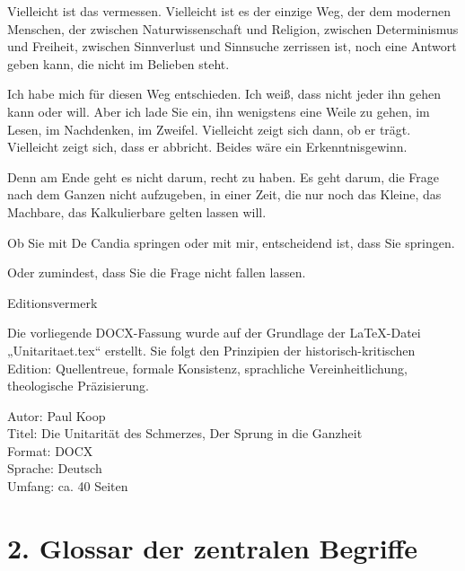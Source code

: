 \documentclass[
  ngerman,
]{article}
\begin{document}
Vielleicht ist das vermessen. Vielleicht ist es der einzige Weg, der dem
modernen Menschen, der zwischen Naturwissenschaft und Religion, zwischen
Determinismus und Freiheit, zwischen Sinnverlust und Sinnsuche zerrissen
ist, noch eine Antwort geben kann, die nicht im Belieben steht.

Ich habe mich für diesen Weg entschieden. Ich weiß, dass nicht jeder ihn
gehen kann oder will. Aber ich lade Sie ein, ihn wenigstens eine Weile
zu gehen, im Lesen, im Nachdenken, im Zweifel. Vielleicht zeigt sich
dann, ob er trägt. Vielleicht zeigt sich, dass er abbricht. Beides wäre
ein Erkenntnisgewinn.

Denn am Ende geht es nicht darum, recht zu haben. Es geht darum, die
Frage nach dem Ganzen nicht aufzugeben, in einer Zeit, die nur noch
das Kleine, das Machbare, das Kalkulierbare gelten lassen will.

Ob Sie mit De Candia springen oder mit mir, entscheidend ist, dass Sie
springen.

Oder zumindest, dass Sie die Frage nicht fallen lassen.

Editionsvermerk

Die vorliegende DOCX-Fassung wurde auf der Grundlage der LaTeX-Datei
„Unitaritaet.tex`` erstellt. Sie folgt den Prinzipien der
historisch-kritischen Edition: Quellentreue, formale Konsistenz,
sprachliche Vereinheitlichung, theologische Präzisierung.

Autor: Paul Koop\\
Titel: Die Unitarität des Schmerzes, Der Sprung in die Ganzheit\\
Format: DOCX\\
Sprache: Deutsch\\
Umfang: ca. 40 Seiten

\section{\texorpdfstring{\textbf{2. Glossar der zentralen
Begriffe}}{2. Glossar der zentralen Begriffe}}\label{glossar-der-zentralen-begriffe}
\end{document}

